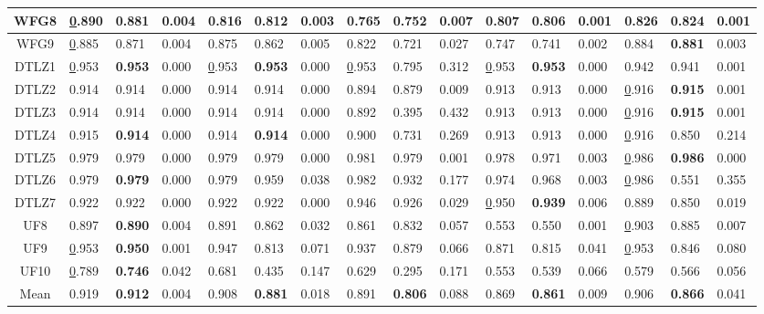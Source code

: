 \begin{table*}[t]
\begin{tabular}{c l|l|l|l|l|l|l|l|l|l|l|l|l|l|l}
\multicolumn{1}{c|}{WFG8} & {\ul 0.890} & \textbf{0.881} & 0.004 & 0.816 & 0.812 & 0.003 & 0.765 & 0.752 & 0.007 & 0.807 & 0.806 & 0.001 & 0.826 & 0.824 & 0.001 \\ \hline
\multicolumn{1}{c|}{WFG9} & {\ul 0.885} & 0.871 & 0.004 & 0.875 & 0.862 & 0.005 & 0.822 & 0.721 & 0.027 & 0.747 & 0.741 & 0.002 & 0.884 & \textbf{0.881} & 0.003 \\ \hline
\multicolumn{1}{c|}{DTLZ1} & {\ul 0.953} & \textbf{0.953} & 0.000 & {\ul 0.953} & \textbf{0.953} & 0.000 & {\ul 0.953} & 0.795 & 0.312 & {\ul 0.953} & \textbf{0.953} & 0.000 & 0.942 & 0.941 & 0.001 \\ \hline
\multicolumn{1}{c|}{DTLZ2} & 0.914 & 0.914 & 0.000 & 0.914 & 0.914 & 0.000 & 0.894 & 0.879 & 0.009 & 0.913 & 0.913 & 0.000 & {\ul 0.916} & \textbf{0.915} & 0.001 \\ \hline
\multicolumn{1}{c|}{DTLZ3} & 0.914 & 0.914 & 0.000 & 0.914 & 0.914 & 0.000 & 0.892 & 0.395 & 0.432 & 0.913 & 0.913 & 0.000 & {\ul 0.916} & \textbf{0.915} & 0.001 \\ \hline
\multicolumn{1}{c|}{DTLZ4} & 0.915 & \textbf{0.914} & 0.000 & 0.914 & \textbf{0.914} & 0.000 & 0.900 & 0.731 & 0.269 & 0.913 & 0.913 & 0.000 & {\ul 0.916} & 0.850 & 0.214 \\ \hline
\multicolumn{1}{c|}{DTLZ5} & 0.979 & 0.979 & 0.000 & 0.979 & 0.979 & 0.000 & 0.981 & 0.979 & 0.001 & 0.978 & 0.971 & 0.003 & {\ul 0.986} & \textbf{0.986} & 0.000 \\ \hline
\multicolumn{1}{c|}{DTLZ6} & 0.979 & \textbf{0.979} & 0.000 & 0.979 & 0.959 & 0.038 & 0.982 & 0.932 & 0.177 & 0.974 & 0.968 & 0.003 & {\ul 0.986} & 0.551 & 0.355 \\ \hline
\multicolumn{1}{c|}{DTLZ7} & 0.922 & 0.922 & 0.000 & 0.922 & 0.922 & 0.000 & 0.946 & 0.926 & 0.029 & {\ul 0.950} & \textbf{0.939} & 0.006 & 0.889 & 0.850 & 0.019 \\ \hline
\multicolumn{1}{c|}{UF8} & 0.897 & \textbf{0.890} & 0.004 & 0.891 & 0.862 & 0.032 & 0.861 & 0.832 & 0.057 & 0.553 & 0.550 & 0.001 & {\ul 0.903} & 0.885 & 0.007 \\ \hline
\multicolumn{1}{c|}{UF9} & {\ul 0.953} & \textbf{0.950} & 0.001 & 0.947 & 0.813 & 0.071 & 0.937 & 0.879 & 0.066 & 0.871 & 0.815 & 0.041 & {\ul 0.953} & 0.846 & 0.080 \\ \hline
\multicolumn{1}{c|}{UF10} & {\ul 0.789} & \textbf{0.746} & 0.042 & 0.681 & 0.435 & 0.147 & 0.629 & 0.295 & 0.171 & 0.553 & 0.539 & 0.066 & 0.579 & 0.566 & 0.056 \\ \hline
\multicolumn{1}{c|}{Mean} & 0.919 & \textbf{0.912} & 0.004 & 0.908 & \textbf{0.881} & 0.018 & 0.891 & \textbf{0.806} & 0.088 & 0.869 & \textbf{0.861} & 0.009 & 0.906 & \textbf{0.866} & 0.041 \\ \hline
\end{tabular}%
\end{table*}


